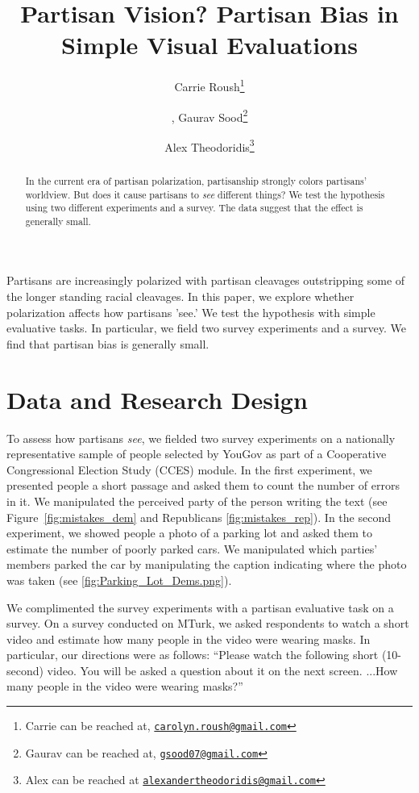 \documentclass[12pt, letterpaper]{article}
\title{Partisan Vision? Partisan Bias in Simple Visual Evaluations}
\author{Carrie Roush\thanks{Carrie can be reached at, \href{mailto:carolyn.roush@gmail.com}{\texttt{carolyn.roush@gmail.com}}} \and, Gaurav Sood\thanks{Gaurav can be reached at, \href{mailto:gsood07@gmail.com}{\texttt{gsood07@gmail.com}}} \and Alex Theodoridis\thanks{Alex can be reached at \href{alexandertheodoridis@gmail.com}{\texttt{alexandertheodoridis@gmail.com}}}}
\begin{document}
\maketitle
\thispagestyle{empty}

\begin{abstract}

\noindent In the current era of partisan polarization, partisanship strongly colors partisans' worldview. But does it cause partisans to \textit{see} different things? We test the hypothesis using two different experiments and a survey. The data suggest that the effect is generally small.
\end{abstract}

\newpage

\doublespacing

Partisans are increasingly polarized \cite{IyengarSoodLelkes2012} with partisan cleavages outstripping some of the longer standing racial cleavages. In this paper, we explore whether polarization affects how partisans 'see.' We test the hypothesis with simple evaluative tasks. In particular, we field two survey experiments and a survey. We find that partisan bias is generally small.

\section{Data and Research Design}
To assess how partisans \textit{see}, we fielded two survey experiments on a nationally representative sample of people selected by YouGov \citep{rivers2007} as part of a Cooperative Congressional Election Study (CCES) module. In the first experiment, we presented people a short passage and asked them to count the number of errors in it. We manipulated the perceived party of the person writing the text (see Figure~\ref{fig:mistakes_dem} and Republicans \ref{fig:mistakes_rep}). In the second experiment, we showed people a photo of a parking lot and asked them to estimate the number of poorly parked cars. We manipulated which parties' members parked the car by manipulating the caption indicating where the photo was taken (see \ref{fig:Parking_Lot_Dems.png}).

We complimented the survey experiments with a partisan evaluative task on a survey. On a survey conducted on MTurk, we asked respondents to watch a short video and estimate how many people in the video were wearing masks. In particular, our directions were as follows: ``Please watch the following short (10-second) video. You will be asked a question about it on the next screen. ...How many people in the video were wearing masks?''
\end{document}
